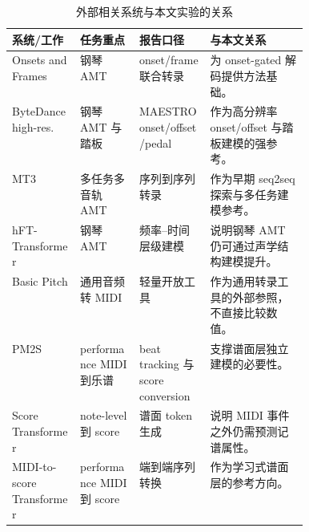 \begin{table}[H]
\centering
\caption{外部相关系统与本文实验的关系}
\label{tab:external_references}
\small
\begin{tabularx}{\linewidth}{>{\raggedright\arraybackslash}p{0.23\linewidth} >{\raggedright\arraybackslash}p{0.20\linewidth} >{\raggedright\arraybackslash}X >{\raggedright\arraybackslash}X}
\toprule
系统/工作 & 任务重点 & 报告口径 & 与本文关系 \\
\midrule
Onsets and Frames \cite{hawthorne2018onsets} & 钢琴 AMT & onset/frame 联合转录 & 为 onset-gated 解码提供方法基础。 \\
ByteDance high-res. \cite{kong2021highres} & 钢琴 AMT 与踏板 & MAESTRO onset/offset/pedal & 作为高分辨率 onset/offset 与踏板建模的强参考。 \\
MT3 \cite{gardner2022mt3} & 多任务多音轨 AMT & 序列到序列转录 & 作为早期 seq2seq 探索与多任务建模参考。 \\
hFT-Transformer \cite{toyama2023hft} & 钢琴 AMT & 频率--时间层级建模 & 说明钢琴 AMT 仍可通过声学结构建模提升。 \\
Basic Pitch \cite{basicpitch2022} & 通用音频转 MIDI & 轻量开放工具 & 作为通用转录工具的外部参照，不直接比较数值。 \\
PM2S \cite{liu2022pm2s} & performance MIDI 到乐谱 & beat tracking 与 score conversion & 支撑谱面层独立建模的必要性。 \\
Score Transformer \cite{suzuki2021scoretransformer} & note-level 到 score & 谱面 token 生成 & 说明 MIDI 事件之外仍需预测记谱属性。 \\
MIDI-to-score Transformer \cite{beyer2024midi2score} & performance MIDI 到 score & 端到端序列转换 & 作为学习式谱面层的参考方向。 \\
\bottomrule
\end{tabularx}
\end{table}

